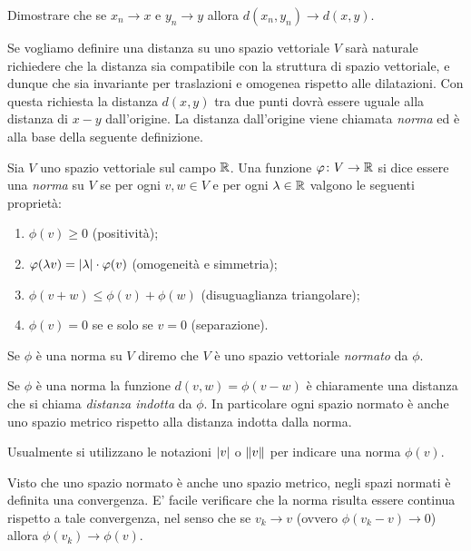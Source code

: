 \begin{exercise}
Dimostrare che se $x_n\to x$ e $y_n\to y$
allora $d(x_n,y_n) \to d(x,y)$.
\end{exercise}

Se vogliamo definire una distanza su uno spazio vettoriale $V$
sarà naturale richiedere che la distanza sia compatibile con la struttura
di spazio vettoriale, e dunque che sia invariante per traslazioni 
e omogenea rispetto alle dilatazioni.
Con questa richiesta la distanza $d(x,y)$ tra due punti dovrà essere 
uguale alla distanza di $x-y$ dall'origine.
La distanza dall'origine viene chiamata \emph{norma} ed è alla base 
della seguente definizione.

\begin{definition}
\mymark{*}
\label{def:norma}
Sia $V$ uno spazio vettoriale sul campo ${\mathbb R}$.
Una funzione $\varphi \colon V\to {\mathbb R}$ si
dice essere una \emph{norma}%
%
 su $V$ se
per ogni $v,w\in V$ e per ogni $\lambda \in {\mathbb R}$
valgono le seguenti proprietà:
\begin{enumerate}
\item
  $\phi(v) \ge 0$ (positività);
\item
  $\varphi(\lambda v) = {\left|\lambda\right|} \cdot \varphi(v)$ (omogeneità e simmetria);
\item
  $\phi(v+w) \le \phi(v) + \phi(w)$
  (disuguaglianza triangolare);
\item
  $\phi(v)=0$ se e solo se $v=0$ (separazione).
\end{enumerate}

Se $\phi$ è una norma su $V$ diremo che
$V$
è uno spazio vettoriale \emph{normato}%
%
 da $\phi$.

Se $\phi$ è una norma la funzione $d(v,w) = \phi(v-w)$
è chiaramente una distanza che si chiama
\emph{distanza indotta}
%
%
da $\phi$.
In particolare ogni spazio normato è anche uno spazio metrico rispetto alla
distanza indotta dalla norma.
\end{definition}

Usualmente si utilizzano le notazioni ${\left|v\right|}$ o ${\left\Vert v\right\Vert}$ per indicare
una norma $\phi(v)$.

Visto che uno spazio normato è anche uno spazio metrico, negli spazi
normati è definita una convergenza. E' facile verificare che la norma risulta
essere continua rispetto a tale convergenza, nel senso che se $v_k \to v$
(ovvero $\phi(v_k-v)\to 0$) allora $\phi(v_k)\to \phi(v)$.


